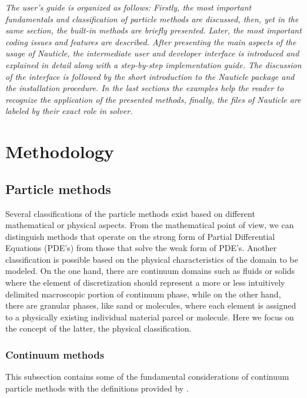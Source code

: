 \documentclass[a4paper,12pt,openany]{book}
\theoremstyle{break}
\begin{document}
\textit{The user's guide is organized as follows: Firstly, the most important fundamentals and classification of particle methods are discussed, then, yet in the same section, the built-in methods are briefly presented. Later, the most important coding issues and features are described. After presenting the main aspects of the usage of Nauticle, the intermediate user and developer interface is introduced and explained in detail along with a step-by-step implementation guide. The discussion of the interface is followed by the short introduction to the Nauticle package and the installation procedure. In the last sections the examples help the reader to recognize the application of the presented methods, finally, the files of Nauticle are labeled by their exact role in solver.}

\section{Methodology}
\subsection{Particle methods} \label{sec:particle_method_classification}
Several classifications of the particle methods exist based on different mathematical or physical aspects. From the mathematical point of view, we can distinguish methods that operate on the strong form of Partial Differential Equations (PDE's) from those that solve the weak form of PDE's. Another classification is possible based on the physical characteristics of the domain to be modeled. On the one hand, there are continuum domains such as fluids or solids where the element of discretization should represent a more or less intuitively delimited macroscopic portion of continuum phase, while on the other hand, there are granular phases, like sand or molecules, where each element is assigned to a physically existing individual material parcel or molecule. Here we focus on the concept of the latter, the physical classification.
\subsubsection{Continuum methods}
This subsection contains some of the fundamental considerations of continuum particle methods with the definitions provided by \cite{Shaofan2007}. \\
\end{document}
